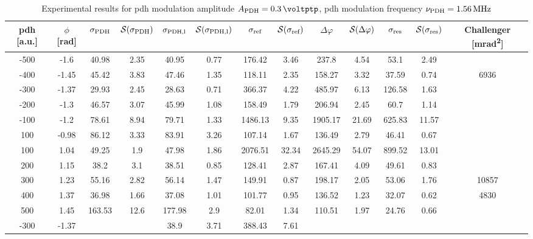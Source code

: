 \begin{landscape}
	
	\begin{table}
	\centering
	\begin{tabular}{|c|c|c|c|c|c|c|c|c|c|c|c|c|}
		\hline
		\gls{pdh} [a.u.] & $\phi$ [\si{\radian}] & $\sigma_{\text{PDH}}$ & $\mathcal{S}(\sigma_{\text{PDH}})$ & $\sigma_{\text{PDH,l}}$ & $\mathcal{S}(\sigma_{\text{PDH,l}})$  & $\sigma_{\text{ref}}$ & $\mathcal{S}(\sigma_{\text{ref}})$ & $\Delta \varphi$ & $\mathcal{S}(\Delta \varphi)$ & $\sigma_{\text{res}}$  & $\mathcal{S}(\sigma_{\text{res}})$ & Challenger [\si{\milli\radian\squared}] \\
		\hline
		\hline
		-500 & -1.6 & 40.98 & 2.35 & 40.95 & 0.77 & 176.42 & 3.46 & 237.8 & 4.54 & 53.1 & 2.49 & \\
		-400 & -1.45 & 45.42 & 3.83 & 47.46 & 1.35 & 118.11 & 2.35 & 158.27 & 3.32 & 37.59 & 0.74 & 6936\\
		-300 & -1.37 & 29.93 & 2.45 & 28.63 & 0.71 & 366.37 & 4.22 & 485.97 & 6.13 & 126.58 & 1.63 & \\
		-200 & -1.3 & 46.57 & 3.07 & 45.99 & 1.08 & 158.49 & 1.79 & 206.94 & 2.45 & 60.7 & 1.14 & \\
		-100 & -1.2 & 78.61 & 8.94 & 79.71 & 1.33 & 1486.13 & 9.35 & 1905.17 & 21.69 & 625.83 & 11.57 & \\
		100 & -0.98 & 86.12 & 3.33 & 83.91 & 3.26 & 107.14 & 1.67 & 136.49 & 2.79 & 46.41 & 0.67 & \\
		100 & 1.04 & 49.25 & 1.9 & 47.98 & 1.86 & 2076.51 & 32.34 & 2645.29 & 54.07 & 899.52 & 13.01 & \\
		200 & 1.15 & 38.2 & 3.1 & 38.51 & 0.85 & 128.41 & 2.87 & 167.41 & 4.09 & 49.61 & 0.83 & \\
		300 & 1.23 & 55.16 & 2.82 & 56.14 & 1.47 & 149.91 & 0.87 & 198.17 & 2.05 & 53.06 & 1.76 & 10857\\
		400 & 1.37 & 36.98 & 1.66 & 37.08 & 1.01 & 101.77 & 0.95 & 136.52 & 1.23 & 32.07 & 0.62 & 4830\\
		500 & 1.45 & 163.53 & 12.6 & 177.98 & 2.9 & 82.01 & 1.34 & 110.51 & 1.97 & 24.76 & 0.66 & \\
		\hline
		\hline
		-300 & -1.37 & & & 38.9 & 3.71 & 388.43 & 7.61 & & & & & \\
		\hline
	\end{tabular}
	\caption{Experimental results for \gls{pdh} modulation amplitude $\tind{A}{PDH} = \SI{0.3}{\voltptp}$, \gls{pdh} modulation frequency $\nu_{\text{PDH}} = \SI{1.56}{\mega\hertz}$}
	\end{table}
	

\end{landscape}
